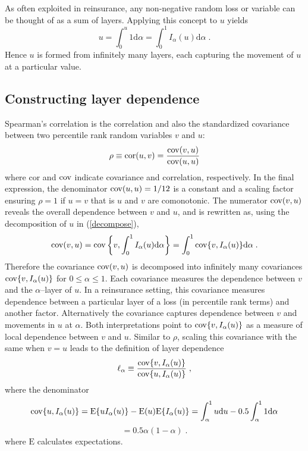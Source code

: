 \documentclass[authoryear]{elsarticle}
\newcommand{\cov}{{\rm cov}}
\newcommand{\E}{{\mathrm E}}
\newcommand{\cor}{\mathrm{cor}}
\newcommand{\de}{\mathrm{d}}
\newcommand{\eref}[1]{(\ref{#1})}
\begin{document}
As often exploited  in reinsurance, any non-negative random loss or variable can be thought of as a sum of layers. Applying this concept to $u$ yields
\begin{equation}\label{decompose}
u=\int_0^u 1\de \alpha= \int_0^1 I_\alpha(u)\de\alpha    \;.
\end{equation}
Hence $u$ is formed from infinitely many layers, each capturing the movement of $u$ at a particular value.


\subsection{Constructing layer dependence}

Spearman's correlation is the correlation and also the standardized covariance between two percentile rank random variables $v$ and $u$:
$$
\rho \equiv \cor(u,v) = \frac{\cov(v,u)}{\cov(u,u)}
$$
where $\cor$ and $\cov$ indicate covariance and correlation, respectively. In the final expression, the denominator $\cov(u,u)=1/12$ is a constant and a scaling factor ensuring $\rho=1$ if $u=v$ that is $u$ and $v$ are comonotonic. The numerator $\cov(v,u)$ reveals the overall dependence between $v$ and $u$, and is rewritten as, using the decomposition of $u$ in \eref{decompose},
\begin{equation}\label{spearman}
\cov(v,u)=\cov\left\{v,\int_0^1I_\alpha(u)\de \alpha \right\}= \int_0^1 \cov\{v,I_\alpha(u)\} \de \alpha \; .
\end{equation}
Therefore the covariance $\cov(v,u)$ is decomposed into infinitely many covariances $\cov\{v,I_\alpha(u)\}$ for $0\le\alpha\le 1$. Each covariance measures the dependence between $v$ and the $\alpha$--layer of $u$. In a reinsurance setting, this covariance measures dependence between a particular layer of a loss (in percentile rank terms) and another factor. Alternatively the covariance captures dependence between $v$ and movements in $u$ at $\alpha$. Both interpretations point to $\cov\{v,I_\alpha(u)\}$ as a measure of local dependence between $v$ and $u$. Similar to $\rho$, scaling this covariance with the same when $v=u$ leads to the definition of layer dependence
\begin{equation}\label{ellalpha}
\ell_\alpha \equiv \frac{\cov\{v,I_\alpha(u)\}}{\cov\{u,I_\alpha(u)\}}   \;,
\end{equation}
where the denominator 
$$
\cov\{u,I_\alpha(u)\}=\E\{uI_\alpha(u)\}-\E(u)\E\{I_\alpha(u)\}=\int_\alpha^1 u \de u - 0.5\int_\alpha^1 1 \de \alpha
$$
$$
=0.5\alpha(1-\alpha) \;.
$$
where $\E$ calculates expectations. 
\end{document}
